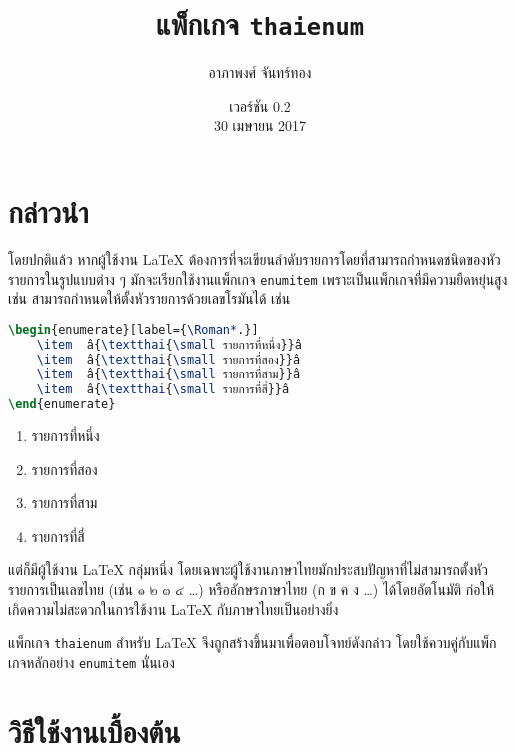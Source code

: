 \documentclass[11pt]{ltxguide}
\title{แพ็กเกจ \textlatin{\texttt{thaienum}}}
\author{อาภาพงศ์ จันทร์ทอง}
\date{เวอร์ชัน 0.2\\30 เมษายน 2017}
\renewcommand{\baselinestretch}{1.5}
\begin{document}
\maketitle

\section{กล่าวนำ}

โดยปกติแล้ว หากผู้ใช้งาน \textlatin{\textrm\LaTeX} ต้องการที่จะเขียนลำดับรายการโดยที่สามารถกำหนดชนิดของหัวรายการในรูปแบบต่าง ๆ มักจะเรียกใช้งานแพ็กเกจ \texttt{enumitem} เพราะเป็นแพ็กเกจที่มีความยืดหยุ่นสูง เช่น สามารถกำหนดให้ตั้งหัวรายการด้วยเลขโรมันได้ เช่น

\smallskip
\renewcommand{\baselinestretch}{0.1}
\begin{lstlisting}[language=LaTeX,escapechar={â},basicstyle=\ttfamily,lineskip={0.05pc}]
\begin{enumerate}[label={\Roman*.}]
    \item  â{\textthai{\small รายการที่หนึ่ง}}â
    \item  â{\textthai{\small รายการที่สอง}}â
    \item  â{\textthai{\small รายการที่สาม}}â
    \item  â{\textthai{\small รายการที่สี่}}â
\end{enumerate}
\end{lstlisting}
\renewcommand{\baselinestretch}{1.5}

\begin{enumerate}[topsep=0pc,itemsep=0pc,label={\latintext\rmfamily\Roman*.}]
    \item รายการที่หนึ่ง
    \item รายการที่สอง
    \item รายการที่สาม
    \item รายการที่สี่
\end{enumerate}

\medskip
แต่ก็มีผู้ใช้งาน \textlatin{\textrm\LaTeX} กลุ่มหนึ่ง โดยเฉพาะผู้ใช้งานภาษาไทยมักประสบปัญหาที่ไม่สามารถตั้งหัวรายการเป็นเลขไทย (เช่น ๑ ๒ ๓ ๔ \ldots) หรืออักษรภาษาไทย (ก ข ค ง \ldots) ได้โดยอัตโนมัติ ก่อให้เกิดความไม่สะดวกในการใช้งาน \textlatin{\textrm\LaTeX} กับภาษาไทยเป็นอย่างยิ่ง

แพ็กเกจ \textlatin{\texttt{thaienum}} สำหรับ \textlatin{\textrm\LaTeX} จึงถูกสร้างขึ้นมาเพื่อตอบโจทย์ดังกล่าว โดยใช้ควบคู่กับแพ็กเกจหลักอย่าง \texttt{enumitem} นั่นเอง


\section{วิธีใช้งานเบื้องต้น}
\end{document}
